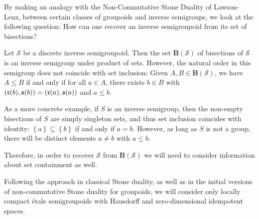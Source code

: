 By making an analogy with the Non-Commutative Stone Duality of Lawson-Lenz, between certain classes of groupoids and inverse semigroups, we look at the following question: How can one recover an inverse semigroupoid from its set of bisections?

Let $\mathcal{S}$ be a discrete inverse semigroupoid. Then the set $\mathbf{B}(\mathcal{S})$ of bisections of $\mathcal{S}$ is an inverse semigroup under product of sets. However, the natural order in this semigroup does not coincide with set inclusion: Given $A,B\in\mathbf{B}(\mathcal{S})$, we have $A\leq B$ if and only if for all $a\in A$, there exists $b\in B$ with $(\operatorname{\mathfrak{r}}(b),\operatorname{\mathfrak{s}}(b))=(\operatorname{\mathfrak{r}}(a),\operatorname{\mathfrak{s}}(a))$ and $a\leq b$.

As a more concrete example, if $S$ is an inverse semigroup, then the non-empty bisections of $S$ are simply singleton sets, and thus set inclusion coincides with identity: $\left\{a\right\}\subseteq\left\{b\right\}$ if and only if $a=b$. However, as long as $S$ is not a group, there will be distinct elements $a\neq b$ with $a\leq b$.

Therefore, in order to recover $\mathcal{S}$ from $\mathbf{B}(\mathcal{S})$ we will need to consider information about set containment as well.

Following the approach in classical Stone duality, as well as in the initial versions of non-commutative Stone duality for groupoids, we will consider only locally compact étale semigroupoids with Hausdorff and zero-dimensional idempotent spaces.


